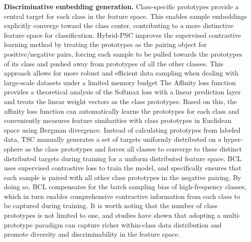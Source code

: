 \textbf{Discriminative embedding generation.}
Class-specific prototypes provide a central target for each class in the feature space. This enables sample embeddings explicitly converge toward the class center, contributing to a more distinctive feature space for classification. 
Hybrid-PSC \cite{wang2021contrastive} improves the supervised contrastive learning method by treating the prototypes as the pairing object for positive/negative pairs, forcing each sample to be pulled towards the prototypes of its class and pushed away from prototypes of all the other classes. This approach allows for more robust and efficient data sampling when dealing with large-scale datasets under a limited memory budget 
The Affinity loss function \cite{hayat2019gaussian} provides a theoretical analysis of the Softmax loss with a linear prediction layer and treats the linear weight vectors as the class prototypes. Based on this, the affinity loss function can automatically learns the prototypes for each class and conveniently measures feature similarities with class prototypes in Euclidean space using Bergman divergence.
Instead of calculating prototypes from labeled data, TSC \cite{li2022targeted} manually generates a set of targets uniformly distributed on a hyper-sphere as the class prototypes and forces all classes to converge to these distinct distributed targets during training for a uniform distributed feature space.
BCL \cite{zhu2022balanced} uses supervised contrastive loss to train the model, and specifically ensures that each sample is paired with all other class prototypes in the negative pairing. By doing so, BCL compensates for the batch sampling bias of high-frequency classes, which in turn enables comprehensive contractive information from each class to be captured during training.
It is worth noting that the number of class prototypes is not limited to one, and studies \cite{wang2021contrastive, hayat2019gaussian} have shown that adopting a multi-prototype paradigm can capture richer within-class data distribution and promote diversity and discriminability in the feature space.

